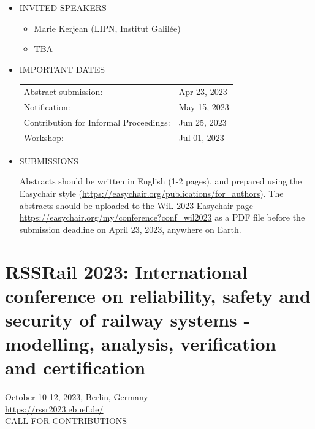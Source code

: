 \documentclass[prodmode,acmtecs]{acmsmall} %
\begin{document}
\begin{itemize}
\item  INVITED SPEAKERS 
 
\begin{itemize}\item  Marie Kerjean (LIPN, Institut Galilée)
\item  TBA
\end{itemize} 
\item  IMPORTANT DATES 
 
\begin{tabulary}{\linewidth}{LL}Abstract submission:  & Apr 23, 2023 \\
Notification:  & May 15, 2023 \\
Contribution for Informal Proceedings:  & Jun 25, 2023 \\
Workshop:  & Jul 01, 2023 \\
\end{tabulary}
 
\item  SUBMISSIONS 
 
  Abstracts should be written in English (1-2 pages), and prepared using the Easychair style (\href{https://easychair.org/publications/for_authors}{https://easychair.org/publications/for\_authors}). The abstracts should be uploaded to the WiL 2023 Easychair page \href{https://easychair.org/my/conference?conf=wil2023}{https://easychair.org/my/conference?conf=wil2023} as a PDF file before the submission deadline on April 23, 2023, anywhere on Earth. 
 
\end{itemize}\section{RSSRail 2023: International conference on reliability, safety and security of railway systems - modelling, analysis, verification and certification}\label{RSSRail2023}  October 10-12, 2023, Berlin, Germany\\ 
  \href{https://rssr2023.ebuef.de/}{https://rssr2023.ebuef.de/}\\ 
CALL FOR CONTRIBUTIONS 
\end{document}
